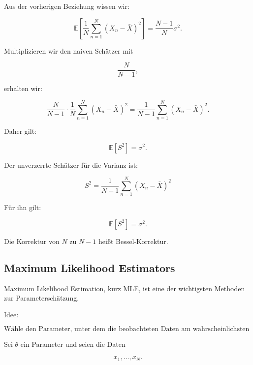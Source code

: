 \documentclass[11pt,a4paper]{scrartcl}
\begin{document}
\begin{calculationbox}
    Aus der vorherigen Beziehung wissen wir:

    \[
        \mathbb{E}
        \left[
            \frac{1}{N}
            \sum_{n=1}^{N}
            (X_n-\bar X)^2
        \right]
        =
        \frac{N-1}{N}
        \sigma^2.
    \]

    Multiplizieren wir den naiven Schätzer mit

    \[
        \frac{N}{N-1},
    \]

    erhalten wir:

    \[
        \frac{N}{N-1}
        \cdot
        \frac{1}{N}
        \sum_{n=1}^{N}
        (X_n-\bar X)^2
        =
        \frac{1}{N-1}
        \sum_{n=1}^{N}
        (X_n-\bar X)^2.
    \]

    Daher gilt:

    \[
        \mathbb{E}[S^2]
        =
        \sigma^2.
    \]
\end{calculationbox}

\begin{answerbox}
    Der unverzerrte Schätzer für die Varianz ist:

    \[
        \boxed{
            S^2
            =
            \frac{1}{N-1}
            \sum_{n=1}^{N}
            (X_n-\bar X)^2
        }
    \]

    Für ihn gilt:

    \[
        \boxed{
            \mathbb{E}[S^2]
            =
            \sigma^2.
        }
    \]

    Die Korrektur von \(N\) zu \(N-1\) heißt Bessel-Korrektur.
\end{answerbox}

\subsection{Maximum Likelihood Estimators}

\begin{notebox}
    Maximum Likelihood Estimation, kurz MLE, ist eine der wichtigsten Methoden
    zur Parameterschätzung.

    Idee:

    \[
        \text{Wähle den Parameter, unter dem die beobachteten Daten am wahrscheinlichsten sind.}
    \]

    Sei \(\theta\) ein Parameter und seien die Daten

    \[
        x_1,\dots,x_N.
    \]
\end{notebox}
\end{document}
